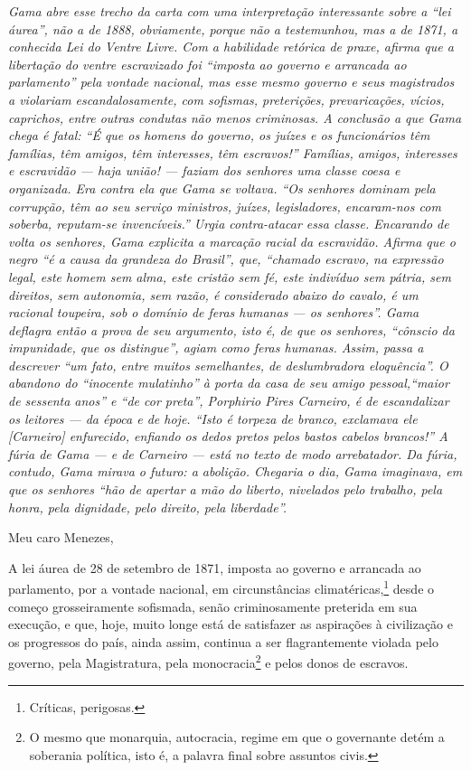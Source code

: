\begin{resumo}
\emph{Gama abre esse trecho da carta com uma interpretação interessante
sobre a ``lei áurea'', não a de 1888, obviamente, porque não a
testemunhou, mas a de 1871, a conhecida Lei do Ventre Livre. Com a
habilidade retórica de praxe, afirma que a libertação do ventre
escravizado foi ``imposta ao governo e arrancada ao parlamento'' pela
vontade nacional, mas esse mesmo governo e seus magistrados a violariam
escandalosamente, com sofismas, preterições, prevaricações, vícios,
caprichos, entre outras condutas não menos criminosas. A conclusão a que
Gama chega é fatal: ``É que os homens do governo, os juízes e os
funcionários têm famílias, têm amigos, têm interesses, têm escravos!''
Famílias, amigos, interesses e escravidão --- haja união! --- faziam dos
senhores uma classe coesa e organizada. Era contra ela que Gama se
voltava. ``Os senhores dominam pela corrupção, têm ao seu serviço
ministros, juízes, legisladores, encaram-nos com soberba, reputam-se
invencíveis.'' Urgia contra-atacar essa classe. Encarando de volta os
senhores, Gama explicita a marcação racial da escravidão. Afirma que o
negro ``é a causa da grandeza do Brasil'', que, ``chamado escravo, na
expressão legal, este homem sem alma, este cristão sem fé, este
indivíduo sem pátria, sem direitos, sem autonomia, sem razão, é
considerado abaixo do cavalo, é um racional toupeira, sob o domínio de
feras humanas --- os senhores''. Gama deflagra então a prova de seu
argumento, isto é, de que os senhores, ``cônscio da impunidade, que os
distingue'', agiam como feras humanas. Assim, passa a descrever ``um fato,
entre muitos semelhantes, de deslumbradora eloquência''. O abandono do
``inocente mulatinho'' à porta da casa de seu amigo pessoal,``maior de
sessenta anos'' e ``de cor preta'', Porphirio Pires Carneiro, é de
escandalizar os leitores --- da época e de hoje. ``Isto é torpeza de
branco, exclamava ele {[}Carneiro{]} enfurecido, enfiando os dedos
pretos pelos bastos cabelos brancos!'' A fúria de Gama --- e de Carneiro
--- está no texto de modo arrebatador. Da fúria, contudo, Gama mirava o
futuro: a abolição. Chegaria o dia, Gama imaginava, em que os senhores
``hão de apertar a mão do liberto, nivelados pelo trabalho, pela honra,
pela dignidade, pelo direito, pela liberdade''. }
\end{resumo}

Meu caro Menezes,

A lei áurea de 28 de setembro de 1871, imposta ao governo e arrancada ao
parlamento, por a vontade nacional, em circunstâncias
climatéricas,\footnote{Críticas, perigosas.} desde o começo
grosseiramente sofismada, senão criminosamente preterida em sua
execução, e que, hoje, muito longe está de satisfazer as aspirações à
civilização e os progressos do país, ainda assim, continua a ser
flagrantemente violada pelo governo, pela Magistratura, pela
monocracia\footnote{O mesmo que monarquia, autocracia, regime em que o
  governante detém a soberania política, isto é, a palavra final sobre
  assuntos civis.} e pelos donos de escravos.

